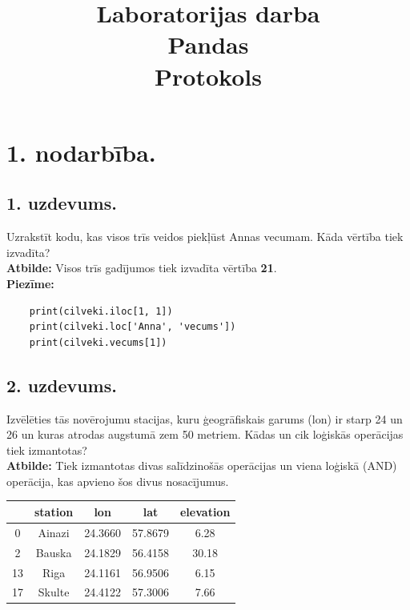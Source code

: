 \documentclass[12pt]{article}
\title{\vspace{-1cm}\centering Laboratorijas darba \\[1ex] \large Pandas \\ Protokols \vspace{-6em}}
\author{}
\date{}
\begin{document}
\maketitle

\section*{1. nodarbība.}

\subsection*{1. uzdevums.} Uzrakstīt kodu, kas visos trīs veidos piekļūst Annas vecumam. Kāda vērtība tiek izvadīta? \\

 \noindent\textbf{Atbilde:} Visos trīs gadījumos tiek izvadīta vērtība \textbf{21}.
     \\

\noindent \textbf{Piezīme:} \begin{verbatim}
    print(cilveki.iloc[1, 1])
    print(cilveki.loc['Anna', 'vecums'])
    print(cilveki.vecums[1])
    \end{verbatim}

\subsection*{2. uzdevums.} Izvēlēties tās novērojumu stacijas, kuru ģeogrāfiskais garums (lon) ir starp 24 un 26 un kuras atrodas augstumā zem 50 metriem. Kādas un cik loģiskās operācijas tiek izmantotas?\\

\noindent \textbf{Atbilde:} Tiek izmantotas divas salīdzinošās operācijas un viena loģiskā (AND) operācija, kas apvieno šos divus nosacījumus. 
        \begin{table}[ht]
                    \centering
                    \begin{tabular}{ccccc}
                    \hline
                     & station & lon & lat & elevation \\ \hline
                    0  & Ainazi  & 24.3660 & 57.8679 & 6.28 \\
                    2  & Bauska  & 24.1829 & 56.4158 & 30.18 \\
                    13 & Riga    & 24.1161 & 56.9506 & 6.15 \\
                    17 & Skulte  & 24.4122 & 57.3006 & 7.66 \\ \hline
                    \end{tabular}
                    \label{tab:stationdata}
                    \end{table}
\end{document}
